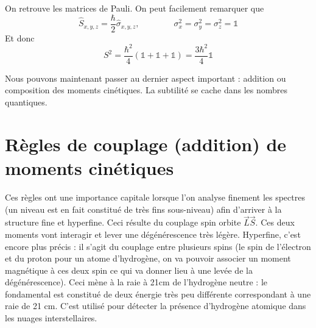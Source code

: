 	On retrouve les matrices de Pauli. On peut facilement remarquer que
	\begin{equation}
	\hat{S}_{x,y,z} = \frac{\hbar}{2}\hat{\sigma}_{x,y,z},\qquad\qquad \sigma_x^2 = \sigma_y^2 
	=\sigma_z^2 = \mathbb{1}
	\end{equation}
	Et donc
	\begin{equation}
	S^2 = \frac{\hbar^2}{4}(\mathbb{1}+\mathbb{1}+\mathbb{1}) = \frac{3\hbar^2}{4}\mathbb{1}
	\end{equation}

	Nous pouvons maintenant passer au dernier aspect important : addition ou composition des 
	moments cinétiques. La subtilité se cache dans les nombres quantiques.
	
\section{Règles de couplage (addition) de moments cinétiques}
Ces règles ont une importance capitale lorsque l'on analyse finement les spectres 
(un niveau est en fait constitué de très fins sous-niveau) afin d'arriver à la 
structure fine et hyperfine. Ceci résulte du couplage spin orbite $\vec L\vec S$. 
Ces deux moments vont interagir et lever une dégénérescence très légère. Hyperfine, 
c'est encore plus précis : il s'agit du couplage entre plusieurs spins (le spin de 
l'électron et du proton pour un atome d'hydrogène, on va pouvoir associer un moment 
magnétique à ces deux spin ce qui va donner lieu à une levée de la dégénérescence). 
Ceci mène à la raie à 21cm de l'hydrogène neutre : le fondamental est constitué de 
deux énergie très peu différente correspondant à une raie de 21 cm. C'est utilisé pour 
détecter la présence d’hydrogène atomique dans les nuages interstellaires. \\


